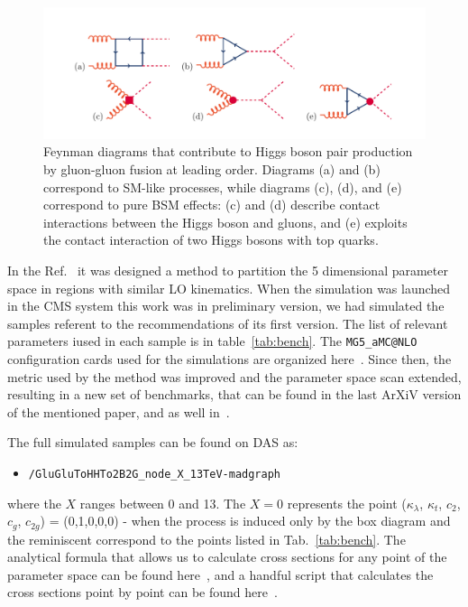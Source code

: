 \begin{figure}[h]
\centering
\includegraphics[scale=0.85]{figures/translation.pdf}
\caption{\small Feynman diagrams that contribute to Higgs boson pair production by gluon-gluon fusion at leading order. Diagrams (a) and (b) correspond to SM-like processes, while diagrams (c), (d), and (e) correspond to pure BSM effects: (c) and (d) describe contact interactions between the Higgs boson and gluons, and (e) exploits the contact interaction of two Higgs bosons with top quarks.   \label{fig:dia}}
\end{figure} 

In the Ref.~\cite{Dall'Osso:2015aia} it was designed a method to partition the 5 dimensional parameter space in regions 
with similar LO kinematics. 
When the simulation was launched in the CMS system this work was in preliminary version, we had simulated the samples 
referent to the recommendations of its first version. The list of relevant parameters iused in each sample is in table~\ref{tab:bench}. 
 The {\tt MG5\_aMC@NLO} configuration cards used for the simulations are organized here~\cite{cards}. 
Since then, the metric used by the method was improved and the parameter space scan extended, resulting in a 
new set of benchmarks, that can be found in the last ArXiV version of the mentioned paper, and as well in~\cite{MelladoGarcia:2150771}.


The full simulated samples can be found on DAS as:
\begin{itemize}
  \item \verb|/GluGluToHHTo2B2G_node_X_13TeV-madgraph|
\end{itemize}
where the $X$ ranges between 0 and 13. The $X=0$ represents the point ($\kappa_{\lambda}$, $\kappa_{t}$, $c_2$, $c_g$, $c_{2g}$) = (0,1,0,0,0) - when the process is induced only by the box diagram and the reminiscent correspond to the points listed in Tab.~\ref{tab:bench}.
The analytical formula that allows us to calculate cross sections for any point of the parameter space can be found here~\cite{CarvalhoAntunesDeOliveira:2130724}, and a handful script that calculates the cross sections point by point can be found here~\cite{hhrosetta}.  

